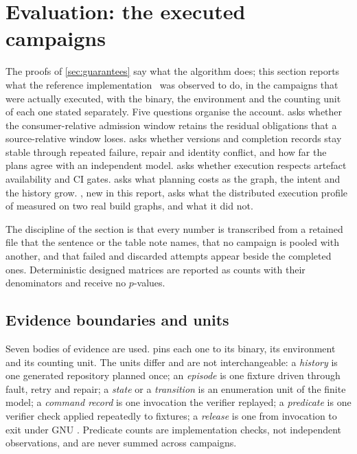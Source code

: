 
\section{Evaluation: the executed campaigns}
\label{sec:evaluation}

The proofs of \cref{sec:guarantees} say what the algorithm does; this section
reports what the reference implementation~\cite{dispat} was observed to do, in
the campaigns that were actually executed, with the binary, the environment and
the counting unit of each one stated separately. Five questions organise the
account.  asks whether the consumer-relative admission window retains
the residual obligations that a source-relative window loses.  asks
whether versions and completion records stay stable through repeated failure,
repair and identity conflict, and how far the plans agree with an independent
model.  asks whether execution respects artefact availability and CI
gates.  asks what planning costs as the graph, the intent and the
history grow. , new in this report, asks what the distributed execution
profile of  measured on two real build graphs, and what it did not.

The discipline of the section is that every number is transcribed from a
retained file that the sentence or the table note names, that no campaign is
pooled with another, and that failed and discarded attempts appear beside the
completed ones. Deterministic designed matrices are reported as counts with
their denominators and receive no $p$-values.

\subsection{Evidence boundaries and units}
\label{sec:eval:boundaries}

Seven bodies of evidence are used.  pins each one to
its binary, its environment and its counting unit. The units differ and are
not interchangeable: a \emph{history} is one generated repository planned once;
an \emph{episode} is one fixture driven through fault, retry and repair; a
\emph{state} or a \emph{transition} is an enumeration unit of the finite model;
a \emph{command record} is one invocation the verifier replayed; a
\emph{predicate} is one verifier check applied repeatedly to fixtures; a
\emph{release} is one  from invocation to exit under
GNU . Predicate counts are implementation checks, not independent
observations, and are never summed across campaigns.

